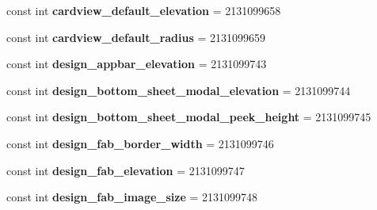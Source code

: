 \begin{DoxyCompactItemize}
const int {\bfseries cardview\+\_\+default\+\_\+elevation} = 2131099658
\item 
\mbox{\label{class_pinned_app_1_1_droid_1_1_resource_1_1_dimension_ac82bea4a392d2684af5272e517e341ef}} 
const int {\bfseries cardview\+\_\+default\+\_\+radius} = 2131099659
\item 
\mbox{\label{class_pinned_app_1_1_droid_1_1_resource_1_1_dimension_aaea9b396dac2345052e86ee5502333de}} 
const int {\bfseries design\+\_\+appbar\+\_\+elevation} = 2131099743
\item 
\mbox{\label{class_pinned_app_1_1_droid_1_1_resource_1_1_dimension_ae4f447290f2d84c05282f37430dd0a4f}} 
const int {\bfseries design\+\_\+bottom\+\_\+sheet\+\_\+modal\+\_\+elevation} = 2131099744
\item 
\mbox{\label{class_pinned_app_1_1_droid_1_1_resource_1_1_dimension_a7ff272c188c3e216c723a51f4802148b}} 
const int {\bfseries design\+\_\+bottom\+\_\+sheet\+\_\+modal\+\_\+peek\+\_\+height} = 2131099745
\item 
\mbox{\label{class_pinned_app_1_1_droid_1_1_resource_1_1_dimension_aa96bb85af73db9aecff2381078800949}} 
const int {\bfseries design\+\_\+fab\+\_\+border\+\_\+width} = 2131099746
\item 
\mbox{\label{class_pinned_app_1_1_droid_1_1_resource_1_1_dimension_a965d2923dc1be2ff7a81e5dd3b5d506c}} 
const int {\bfseries design\+\_\+fab\+\_\+elevation} = 2131099747
\item 
\mbox{\label{class_pinned_app_1_1_droid_1_1_resource_1_1_dimension_a2b93c70eda3c38c090b081adc319c97e}} 
const int {\bfseries design\+\_\+fab\+\_\+image\+\_\+size} = 2131099748
\item 
\mbox{\label{class_pinned_app_1_1_droid_1_1_resource_1_1_dimension_a5849c8c3b585a22d8d51149db28fc1ae}} 

\end{DoxyCompactItemize}

